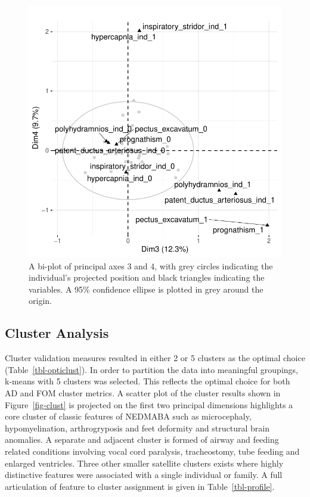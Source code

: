 \documentclass[
  authoryear,
  preprint,
  3p]{elsarticle}
\begin{document}
\begin{figure}

{\centering \includegraphics{paper_files/figure-pdf/fig-biplot2-1.pdf}

}

\caption{\label{fig-biplot2}A bi-plot of principal axes 3 and 4, with
grey circles indicating the individual's projected position and black
triangles indicating the variables. A 95\% confidence ellipse is plotted
in grey around the origin.}

\end{figure}

\hypertarget{cluster-analysis-1}{%
\subsection{Cluster Analysis}\label{cluster-analysis-1}}

Cluster validation measures resulted in either 2 or 5 clusters as the
optimal choice (Table~\ref{tbl-opticlust}). In order to partition the
data into meaningful groupings, k-means with 5 clusters was selected.
This reflects the optimal choice for both AD and FOM cluster metrics. A
scatter plot of the cluster results shown in Figure~\ref{fig-clust} is
projected on the first two principal dimensions highlights a core
cluster of classic features of NEDMABA such as microcephaly,
hypomyelination, arthrogryposis and feet deformity and structural brain
anomalies. A separate and adjacent cluster is formed of airway and
feeding related conditions involving vocal cord paralysis, tracheostomy,
tube feeding and enlarged ventricles. Three other smaller satellite
clusters exists where highly distinctive features were associated with a
single individual or family. A full articulation of feature to cluster
assignment is given in Table~\ref{tbl-profile}.
\end{document}
